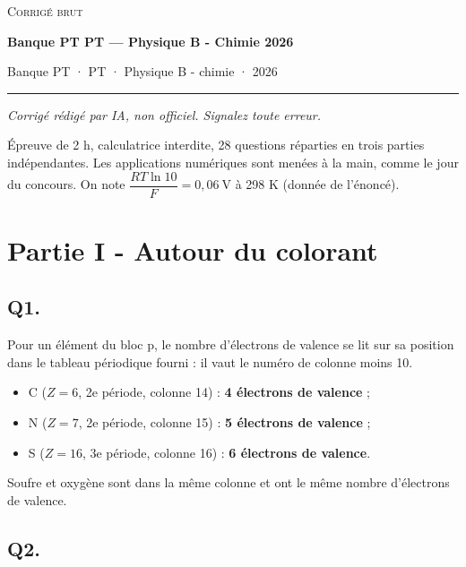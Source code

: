 \documentclass[11pt,a4paper]{article}
\providecommand{\tightlist}{\setlength{\itemsep}{0pt}\setlength{\parskip}{0pt}}
\begin{document}
\thispagestyle{plain}
\begin{center}
  {\small\scshape Corrigé brut}\par\smallskip
  {\LARGE\bfseries Banque PT PT — Physique B - Chimie 2026\par}\medskip
  {\large Banque PT · PT · Physique B - chimie · 2026\par}
\end{center}
\vspace{2pt}\hrule\vspace{8pt}

\emph{Corrigé rédigé par IA, non officiel. Signalez toute erreur.}

Épreuve de 2 h, calculatrice interdite, 28 questions réparties en trois parties indépendantes. Les applications numériques sont menées à la main, comme le jour du concours. On note \(\dfrac{RT\ln 10}{F} = 0{,}06\ \text{V}\) à 298 K (donnée de l'énoncé).

\hypertarget{partie-i---autour-du-colorant}{%
\section{Partie I - Autour du colorant}\label{partie-i---autour-du-colorant}}

\hypertarget{q1.}{%
\subsection{Q1.}\label{q1.}}

Pour un élément du bloc p, le nombre d'électrons de valence se lit sur sa position dans le tableau périodique fourni : il vaut le numéro de colonne moins 10.

\begin{itemize}
\tightlist
\item
  C (\(Z=6\), 2e période, colonne 14) : \textbf{4 électrons de valence} ;
\item
  N (\(Z=7\), 2e période, colonne 15) : \textbf{5 électrons de valence} ;
\item
  S (\(Z=16\), 3e période, colonne 16) : \textbf{6 électrons de valence}.
\end{itemize}

Soufre et oxygène sont dans la même colonne et ont le même nombre d'électrons de valence.

\hypertarget{q2.}{%
\subsection{Q2.}\label{q2.}}
\end{document}
